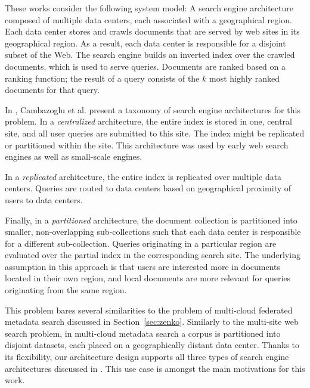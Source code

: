 These works consider the following system model:
A search engine architecture composed of multiple data centers, each associated with a geographical region.
Each data center stores and crawls documents that are served by web sites in its geographical region.
As a result, each data center is responsible for a disjoint subset of the Web.
The search engine builds an inverted index over the crawled documents, which is used to serve queries.
Documents are ranked based on a ranking function; the result of a query consists of the $k$ most highly ranked documents
for that query.

\bigskip
\noindent
In \cite{cambazoglu:multisitequantifying}, Cambazoglu et al. present a taxonomy of search engine architectures for this problem.
In a \textit{centralized} architecture, the entire index is stored in one, central site, and all user queries are submitted to this site.
The index might be replicated or partitioned within the site.
This architecture was used by early web search engines as well as small-scale engines.

In a \textit{replicated} architecture, the entire index is replicated over multiple data centers.
Queries are routed to data centers based on geographical proximity of users to data centers.

Finally, in a \textit{partitioned} architecture, the document collection is partitioned into smaller, non-overlapping
sub-collections such that each data center is responsible for a different sub-collection.
Queries originating in a particular region are evaluated over the partial index in the corresponding search site.
The underlying assumption in this approach is that users are interested more in documents located in their own region,
and local documents are more relevant for queries originating from the same region.

This problem bares several similarities to the problem of multi-cloud federated metadata search discussed in Section~\ref{sec:zenko}.
Similarly to the multi-site web search problem,
in multi-cloud metadata search a corpus is partitioned into disjoint datasets, each placed on a geographically distant
data center.
Thanks to its flexibility, our architecture design supports all three types of search engine architectures discussed in
\cite{cambazoglu:multisitequantifying}.
This use case is amongst the main motivations for this work.

